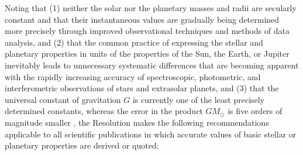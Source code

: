 \documentclass[preprint]{aastex}
\begin{document}
Noting that (1) neither the solar nor the planetary masses and radii are secularly constant and that their instantaneous values are gradually being determined more precisely through improved observational techniques and methods of data analysis, and (2) that the common practice of expressing the stellar and planetary properties in units of the properties of the Sun, the Earth, or Jupiter inevitably leads to unnecessary systematic differences that are becoming apparent with the rapidly increasing accuracy of spectroscopic, photometric, and interferometric observations of stars and extrasolar planets, and (3) that the universal constant of gravitation $G$ is currently one of the least precisely determined constants, whereas the error in the product $GM_\odot$ is five orders of magnitude smaller \citep[and references therein]{petit2010}, the Resolution makes the following recommendations applicable to all scientific publications in which accurate values of basic stellar or planetary properties are derived or quoted:
%
\end{document}
